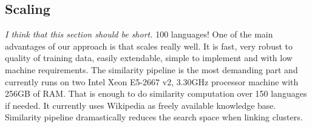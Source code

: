 \documentclass[twoside,11pt]{article}
\begin{document}
\subsection{Scaling}
\emph{I think that this section should be short.}
100 languages!
One of the main advantages of our approach is that scales really well. It is fast, very robust to quality of training data, easily extendable, simple to implement and with low machine requirements. The similarity pipeline is the most demanding part and currently runs on two Intel Xeon E5-2667 v2, 3.30GHz processor machine with 256GB of RAM. That is enough to do similarity computation over 150 languages if needed. It currently uses Wikipedia as freely available knowledge base. Similarity pipeline dramastically reduces the search space when linking clusters.
\end{document}
